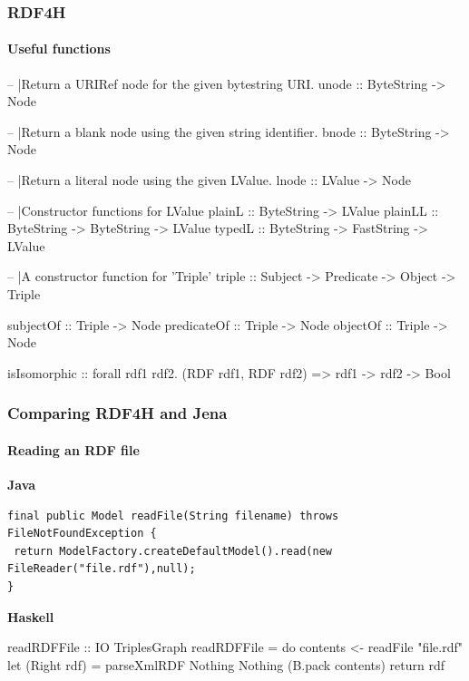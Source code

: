\documentclass{beamer}
\begin{document}
\begin{frame}[fragile]
\frametitle{RDF4H}
\framesubtitle{Useful functions}

\begin{haskellcode}
-- |Return a URIRef node for the given bytestring URI.
unode :: ByteString -> Node

-- |Return a blank node using the given string identifier.
bnode :: ByteString ->  Node

-- |Return a literal node using the given LValue.
lnode :: LValue ->  Node

-- |Constructor functions for LValue
plainL :: ByteString -> LValue
plainLL :: ByteString -> ByteString -> LValue
typedL :: ByteString -> FastString -> LValue

-- |A constructor function for 'Triple'
triple :: Subject -> Predicate -> Object -> Triple

subjectOf :: Triple -> Node
predicateOf :: Triple -> Node
objectOf :: Triple -> Node

isIsomorphic :: forall rdf1 rdf2. (RDF rdf1, RDF rdf2) => rdf1 -> rdf2 -> Bool

\end{haskellcode}

\end{frame}


\begin{frame}[fragile]
\frametitle{Comparing RDF4H and Jena}
\framesubtitle{Reading an RDF file}


\textbf{Java}

\begin{lstlisting}[style=MyJavaStyle]
final public Model readFile(String filename) throws FileNotFoundException {
 return ModelFactory.createDefaultModel().read(new FileReader("file.rdf"),null);
}
\end{lstlisting}

\bigskip
\textbf{Haskell}

\begin{haskellcode}
readRDFFile :: IO TriplesGraph
readRDFFile = do
  contents <- readFile "file.rdf"
  let (Right rdf) = parseXmlRDF Nothing Nothing (B.pack contents)
  return rdf
\end{haskellcode}

\end{frame}
\end{document}
